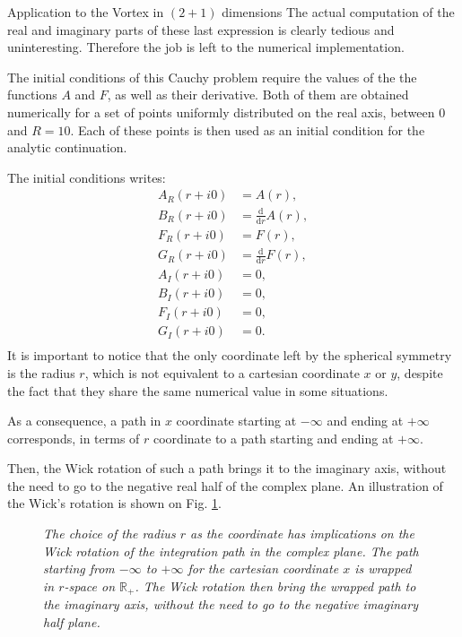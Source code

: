 \begin{section}{Application to the Vortex in $(2+1)$ dimensions}
  The actual computation of the real and imaginary parts of these last
  expression is clearly tedious and uninteresting. Therefore the job
  is left to the numerical implementation.

  The initial conditions of this Cauchy problem require the values of
  the the functions $A$ and $F$, as well as their derivative. Both of
  them are obtained numerically for a set of points uniformly
  distributed on the real axis, between $0$ and $R = 10$. Each of
  these points is then used as an initial condition for the analytic
  continuation.

  The initial conditions writes:
  \begin{align}
    A_R(r+i0) &= A(r),\\
    B_R(r+i0) &= \frac{\mathrm d}{\mathrm d r}A(r),\\
    F_R(r+i0) &= F(r),\\
    G_R(r+i0) &= \frac{\mathrm d}{\mathrm d r}F(r),\\
    A_I(r+i0) &= 0,\\
    B_I(r+i0) &= 0,\\
    F_I(r+i0) &= 0,\\
    G_I(r+i0) &= 0.\\
  \end{align}
  It is important to notice that the only coordinate left by the
  spherical symmetry is the radius $r$, which is not equivalent to a
  cartesian coordinate $x$ or $y$, despite the fact that they share
  the same numerical value in some situations.

  As a consequence, a path in $x$ coordinate starting at $-\infty$ and
  ending at $+\infty$ corresponds, in terms of $r$ coordinate to a path
  starting and ending at $+\infty$.

  Then, the Wick rotation of such a path brings it to the imaginary
  axis, without the need to go to the negative real half of the
  complex plane. An illustration of the Wick's rotation is shown on
  Fig. \ref{fig:s_path}.

  \begin{figure}[!ht]
    \begin{center}
      
      \caption{\em The choice of the radius $r$ as the coordinate has
        implications on the Wick rotation of the integration path in
        the complex plane. The path starting from $-\infty$ to
        $+\infty$ for the cartesian coordinate $x$ is wrapped in
        $r$-space on $\mathbb{R}_+$. The Wick rotation then bring the
        wrapped path to the imaginary axis, without the need to go to the
        negative imaginary half plane.}
      \label{fig:s_path}
    \end{center}
  \end{figure}


\end{section}
